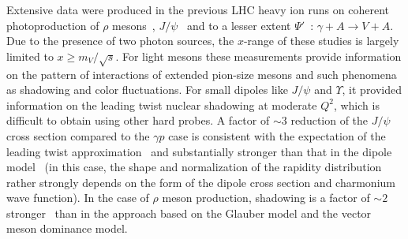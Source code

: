 \documentclass[../report.tex]{subfiles}
\begin{document}
Extensive data were produced in the previous LHC heavy ion runs on coherent photoproduction  of $\rho$ mesons~\cite{Adam:2015gsa}, 
$J/\psi$~\cite{Abbas:2013oua,Abelev:2012ba,Khachatryan:2016qhq} and to a lesser extent $\Psi'$~\cite{Adam:2015sia}: 
$\gamma+ A \to V +A$. Due to the presence of two photon sources, the $x$-range of these studies is largely  limited
to $x\ge m_V/\sqrt{s}$. For light mesons these measurements provide information on the pattern of interactions of extended pion-size mesons and such phenomena as shadowing and color fluctuations. For small dipoles like $J/\psi$ and $\Upsilon$, 
it provided information on the leading twist nuclear shadowing at moderate $Q^2$, which is difficult to obtain using other hard probes. A factor of $\sim 3$ reduction of the $J/\psi$ 
cross section compared to the $\gamma p$ case is consistent with the expectation of the leading twist 
approximation~\cite{Guzey:2013xba,Guzey:2013qza} and substantially stronger than that in the dipole 
model~\cite{Lappi:2013am} (in this case, the shape and normalization of the rapidity distribution rather 
strongly depends on the form of the dipole cross section and charmonium wave function).
In the case of $\rho$ meson production, shadowing is a factor of $\sim 2$ stronger~\cite{Frankfurt:2015cwa} than in the approach based on
the Glauber model and the vector meson dominance model.
\end{document}

